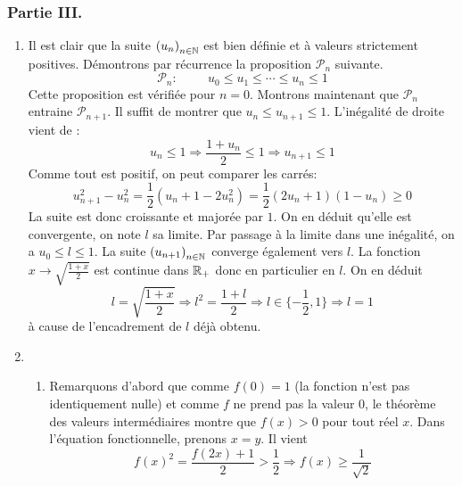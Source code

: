 \subsubsection*{Partie III.}
\begin{enumerate}
 \item Il est clair que la suite $\left(u_n\right) _{n\in \mathbb{N}}$ est bien définie et à valeurs strictement positives. Démontrons par récurrence la proposition $\mathcal P_n$ suivante.
\begin{displaymath}
 \mathcal P_n :\hspace{1cm} u_0\leq u_1\leq \cdots \leq u_n\leq 1
\end{displaymath}
Cette proposition est vérifiée pour $n=0$. Montrons maintenant que $\mathcal P_n$ entraine $\mathcal P_{n+1}$. Il suffit de montrer que $u_n\leq u_{n+1}\leq 1$.\newline
L'inégalité de droite vient de :
\begin{displaymath}
 u_n\leq 1 \Rightarrow \frac{1+u_n}{2}\leq 1 \Rightarrow u_{n+1}\leq 1
\end{displaymath}
Comme tout est positif, on peut comparer les carrés:
\begin{displaymath}
 u_{n+1}^2 - u_n^2 =\frac{1}{2}(u_n+1 - 2u_n^2)=\frac{1}{2}(2u_n+1)(1-u_n)\geq 0
\end{displaymath}
La suite est donc croissante et majorée par $1$. On en déduit qu'elle est convergente, on note $l$ sa limite. Par passage à la limite dans une inégalité, on a $u_0\leq l\leq1$.\newline
La suite $\left(u_{n+1}\right) _{n\in \mathbb{N}}$ converge également vers $l$. La fonction $x\rightarrow\sqrt{\frac{1+x}{2}}$ est continue dans $\mathbb{R}_+$ donc en particulier en $l$. On en déduit
\begin{displaymath}
 l=\sqrt{\frac{1+x}{2}} \Rightarrow l^2 = \frac{1+l}{2}\Rightarrow l\in\{-\frac{1}{2},1\}\Rightarrow l=1
\end{displaymath}
à cause de l'encadrement de $l$ déjà obtenu.
 \item
\begin{enumerate}
 \item Remarquons d'abord que comme $f(0)=1$ (la fonction n'est pas identiquement nulle) et comme $f$ ne prend pas la valeur $0$, le théorème des valeurs intermédiaires montre que $f(x)>0$ pour tout réel $x$. Dans l'équation fonctionnelle, prenons $x=y$. Il vient
\begin{displaymath}
 f(x)^2 = \frac{f(2x)+1}{2}>\frac{1}{2}\Rightarrow f(x)\geq \frac{1}{\sqrt{2}}
\end{displaymath}


\end{enumerate}
\end{enumerate}
